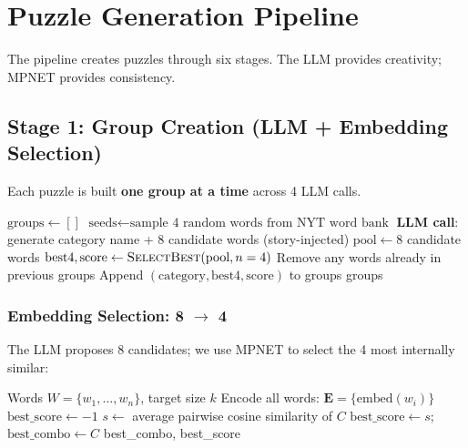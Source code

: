 \documentclass[11pt, letterpaper]{article}
\begin{document}
\section{Puzzle Generation Pipeline}

The pipeline creates puzzles through six stages. The LLM provides creativity; MPNET provides consistency.

\subsection{Stage 1: Group Creation (LLM + Embedding Selection)}

Each puzzle is built \textbf{one group at a time} across 4 LLM calls.

\begin{algorithm}[H]
\caption{Iterative Group Creation}
\begin{algorithmic}[1]
\State $\text{groups} \gets []$
    \State $\text{seeds} \gets \text{sample 4 random words from NYT word bank}$
    \State \textbf{LLM call}: generate category name + 8 candidate words (story-injected)
    \State $\text{pool} \gets 8$ candidate words
    \State $\text{best4}, \text{score} \gets \textsc{SelectBest}(\text{pool}, n=4)$ 
    \State Remove any words already in previous groups
    \State Append $(\text{category}, \text{best4}, \text{score})$ to groups
\EndFor
\State \Return groups
\end{algorithmic}
\end{algorithm}

\subsubsection{Embedding Selection: 8 $\rightarrow$ 4}

The LLM proposes 8 candidates; we use MPNET to select the 4 most internally similar:

\begin{algorithm}[H]
\caption{SelectBest: Choose $k$ most cohesive words from $n$}
\begin{algorithmic}[1]
\Require Words $W = \{w_1, \ldots, w_n\}$, target size $k$
\State Encode all words: $\mathbf{E} = \{\text{embed}(w_i)\}$
\State $\text{best\_score} \gets -1$
 
    \State $s \gets$ average pairwise cosine similarity of $C$
        \State $\text{best\_score} \gets s$; $\text{best\_combo} \gets C$
    \EndIf
\EndFor
\State \Return best\_combo, best\_score
\end{algorithmic}
\end{algorithm}
\end{document}
